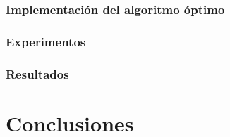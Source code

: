 \documentclass[12pt,letterpaper]{article}
\begin{document}
\subsubsection{Implementación del algoritmo óptimo}
\subsubsection{Experimentos}
\subsubsection{Resultados}

\section{Conclusiones}

\end{document}
